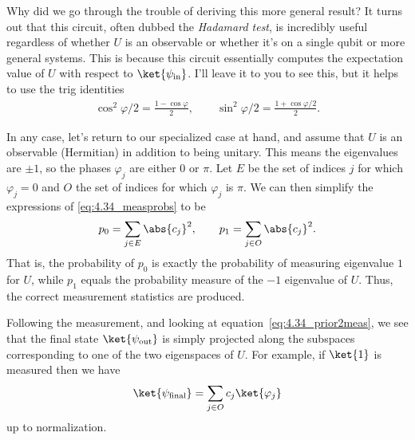 \documentclass{book}
\begin{document}
    Why did we go through the trouble of deriving this more general result? It turns out that this circuit, often dubbed the \emph{Hadamard test}, is incredibly useful regardless of whether $U$ is an observable or whether it's on a single qubit or more general systems. This is because this circuit essentially computes the expectation value of $U$ with respect to $\ket{\psi_\text{in}}$. I'll leave it to you to see this, but it helps to use the trig identities
    \begin{align}
        \cos^2 \varphi/2 = \frac{1-\cos\varphi}{2}, \qquad \sin^2 \varphi/2 = \frac{1 + \cos\varphi/2}{2}.
    \end{align}

    In any case, let's return to our specialized case at hand, and assume that $U$ is an observable (Hermitian) in addition to being unitary. This means the eigenvalues are $\pm 1$, so the phases $\varphi_j$ are either $0$ or $\pi$. Let $E$ be the set of indices $j$ for which $\varphi_j = 0$ and $O$ the set of indices for which $\varphi_j$ is $\pi$. We can then simplify the expressions of \eqref{eq:4.34_measprobs} to be
    \begin{align}
        p_0 = \sum_{j \in E} \abs{c_j}^2, \qquad p_1 = \sum_{j \in O} \abs{c_j}^2.
    \end{align}
    That is, the probability of $p_0$ is exactly the probability of measuring eigenvalue $1$ for $U$, while $p_1$ equals the probability measure of the $-1$ eigenvalue of $U$. Thus, the correct measurement statistics are produced.

    Following the measurement, and looking at equation~\eqref{eq:4.34_prior2meas}, we see that the final state $\ket{\psi_\text{out}}$ is simply projected along the subspaces corresponding to one of the two eigenspaces of $U$. For example, if $\ket{1}$ is measured then we have
    \begin{align}
        \ket{\psi_\text{final}} = \sum_{j\in O} c_j \ket{\varphi_j} 
    \end{align}
    up to normalization.
\end{document}
